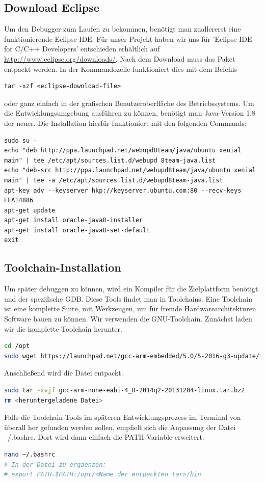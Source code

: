 \subsection{Download Eclipse}
Um den Debugger zum Laufen zu bekommen, benötigt man zuallererst eine funktionierende Eclipse IDE. Für unser Projekt haben wir uns für 'Eclipse IDE for C/C++ Developers' entschieden erhältlich auf \url{http://www.eclipse.org/downloads/}.
Nach dem Download muss das Paket entpackt werden. In der Kommandozeile funktioniert dies mit dem Befehls 
\begin{lstlisting} 
tar -xzf <eclipse-download-file>
\end{lstlisting}
oder ganz einfach in der grafischen Benutzeroberfläche des Betriebssystems.
Um die Entwicklungsumgebung ausführen zu können, benötigt man Java-Version 1.8 der neuer. 
Die Installation hierfür funktioniert mit den folgenden Commands:
\begin{lstlisting}
sudo su -
echo "deb http://ppa.launchpad.net/webupd8team/java/ubuntu xenial main" | tee /etc/apt/sources.list.d/webupd 8team-java.list
echo "deb-src http://ppa.launchpad.net/webupd8team/java/ubuntu xenial main" | tee -a /etc/apt/sources.list.d/webupd8team-java.list
apt-key adv --keyserver hkp://keyserver.ubuntu.com:80 --recv-keys EEA14886
apt-get update
apt-get install oracle-java8-installer
apt-get install oracle-java8-set-default
exit

\end{lstlisting}
\subsection{Toolchain-Installation}
Um später debuggen zu können, wird ein Kompiler für die Zielplattform benötigt und der spezifische GDB. Diese Tools findet man in Toolchains. Eine Toolchain ist eine komplette Suite, mit Werkzeugen, um für fremde Hardwarearchitekturen Software bauen zu können.
Wir verwenden die GNU-Toolchain. Zunächst laden wir die komplette Toolchain herunter.
\begin{lstlisting}[language=sh]
cd /opt
sudo wget https://launchpad.net/gcc-arm-embedded/5.0/5-2016-q3-update/+download/gcc-arm-none-eabi-5_4-2016q3-20160926-linux.tar.bz2
\end{lstlisting}
Anschließend wird die Datei entpackt.
\begin{lstlisting}[language=sh]
sudo tar -xvjf gcc-arm-none-eabi-4_8-2014q2-20131204-linux.tar.bz2
rm <heruntergeladene Datei>
\end{lstlisting}
Falls die Toolchain-Tools im späteren Entwicklungsprozess im Terminal von überall her gefunden werden sollen, empfielt sich die Anpassung der Datei ~/.bashrc. Dort wird dann einfach die PATH-Variable erweitert.
\begin{lstlisting}[language=sh]
nano ~/.bashrc
# In der Datei zu ergaenzen:
# export PATH=$PATH:/opt/<Name der entpackten tar>/bin
\end{lstlisting}
